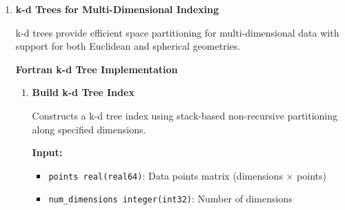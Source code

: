 \documentclass[11pt]{article}
\begin{document}
\begin{enumerate}
\begin{enumerate}
\begin{itemize}
	      	      	\item \texttt{lower\_bound, upper\_bound real(real64)}: Range boundaries
	      	      \end{itemize}
	      	      \textbf{Output:}
	      	      \begin{itemize}
	      	      	\item \texttt{output\_indices integer(int32)}: Indices of matching values
	      	      	      (1-based)
	      	      	      
	      	      	\item \texttt{num\_matches integer(int32)}: Number of matches found
	      	      	      
	      	      	\item \texttt{ierr integer(int32)}: Error code
	      	      \end{itemize}
	      	      \begin{lstlisting}[language=Fortran]
call bst_range_query(values, sorted_indices, num_values, &
                    lower_bound, upper_bound, output_indices, &
                    num_matches, ierr)
	      	      \end{lstlisting}
	      \end{enumerate}
	      
	\item \textbf{k-d Trees for Multi-Dimensional Indexing} \label{sec:kd_trees}
	      
	      k-d trees provide efficient space partitioning for multi-dimensional data with
	      support for both Euclidean and spherical geometries.
	      
	      \textbf{Fortran k-d Tree Implementation}
	      
	      \begin{enumerate}
	      	\item \textbf{Build k-d Tree Index}
	      	      
	      	      Constructs a k-d tree index using stack-based non-recursive partitioning
	      	      along specified dimensions.
	      	      
	      	      \textbf{Input:}
	      	      \begin{itemize}
	      	      	\item \texttt{points real(real64)}: Data points matrix (dimensions ×
	      	      	      points)
	      	      	      
	      	      	\item \texttt{num\_dimensions integer(int32)}: Number of dimensions
	      	      	      

\end{itemize}
\end{enumerate}
\end{enumerate}
\end{document}
